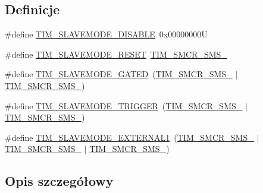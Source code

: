 \subsection*{Definicje}
\begin{DoxyCompactItemize}
\item 
\#define \hyperlink{group___t_i_m___slave___mode_ga3b53e1a85d08f125df4371f86bdaf79b}{T\+I\+M\+\_\+\+S\+L\+A\+V\+E\+M\+O\+D\+E\+\_\+\+D\+I\+S\+A\+B\+LE}~0x00000000U
\item 
\#define \hyperlink{group___t_i_m___slave___mode_ga9f28e350c0560dc550f5c0d2f8b39ba7}{T\+I\+M\+\_\+\+S\+L\+A\+V\+E\+M\+O\+D\+E\+\_\+\+R\+E\+S\+ET}~\hyperlink{group___peripheral___registers___bits___definition_ga63847fc3c71f582403e6301b1229c3ed}{T\+I\+M\+\_\+\+S\+M\+C\+R\+\_\+\+S\+M\+S\+\_}
\item 
\#define \hyperlink{group___t_i_m___slave___mode_ga4501317fcd7649e5ff46db6fe69938e0}{T\+I\+M\+\_\+\+S\+L\+A\+V\+E\+M\+O\+D\+E\+\_\+\+G\+A\+T\+ED}~(\hyperlink{group___peripheral___registers___bits___definition_ga63847fc3c71f582403e6301b1229c3ed}{T\+I\+M\+\_\+\+S\+M\+C\+R\+\_\+\+S\+M\+S\+\_} $\vert$ \hyperlink{group___peripheral___registers___bits___definition_ga7d1ebece401aeb12abd466d2eafa78b2}{T\+I\+M\+\_\+\+S\+M\+C\+R\+\_\+\+S\+M\+S\+\_})
\item 
\#define \hyperlink{group___t_i_m___slave___mode_ga12f8f7b4a16b438f54cf811f0bb0a8a4}{T\+I\+M\+\_\+\+S\+L\+A\+V\+E\+M\+O\+D\+E\+\_\+\+T\+R\+I\+G\+G\+ER}~(\hyperlink{group___peripheral___registers___bits___definition_ga63847fc3c71f582403e6301b1229c3ed}{T\+I\+M\+\_\+\+S\+M\+C\+R\+\_\+\+S\+M\+S\+\_} $\vert$ \hyperlink{group___peripheral___registers___bits___definition_gaa980a3121ab6cda5a4a42b959da8421e}{T\+I\+M\+\_\+\+S\+M\+C\+R\+\_\+\+S\+M\+S\+\_})
\item 
\#define \hyperlink{group___t_i_m___slave___mode_ga90dcf32a66dcb250b18da2ff56471328}{T\+I\+M\+\_\+\+S\+L\+A\+V\+E\+M\+O\+D\+E\+\_\+\+E\+X\+T\+E\+R\+N\+A\+L1}~(\hyperlink{group___peripheral___registers___bits___definition_ga63847fc3c71f582403e6301b1229c3ed}{T\+I\+M\+\_\+\+S\+M\+C\+R\+\_\+\+S\+M\+S\+\_} $\vert$ \hyperlink{group___peripheral___registers___bits___definition_gaa980a3121ab6cda5a4a42b959da8421e}{T\+I\+M\+\_\+\+S\+M\+C\+R\+\_\+\+S\+M\+S\+\_} $\vert$ \hyperlink{group___peripheral___registers___bits___definition_ga7d1ebece401aeb12abd466d2eafa78b2}{T\+I\+M\+\_\+\+S\+M\+C\+R\+\_\+\+S\+M\+S\+\_})
\end{DoxyCompactItemize}


\subsection{Opis szczegółowy}


